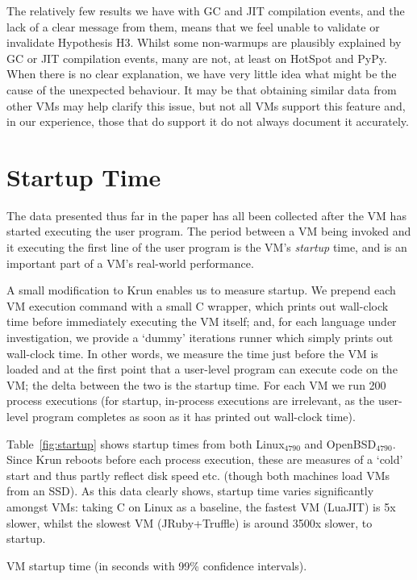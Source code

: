 \documentclass[acmlarge]{acmart}\settopmatter{printfolios=true}
\newcommand{\krun}{Krun\xspace}
\newcommand{\bencherfive}{Linux$_\mathrm{4790}$\xspace}
\newcommand{\benchersix}{OpenBSD$_\mathrm{4790}$\xspace}
\begin{document}
The relatively few results we have with GC and JIT compilation events, and the lack of a clear
message from them, means that we feel unable to validate or invalidate
Hypothesis H3. Whilst some non-warmups are plausibly explained by GC or JIT compilation events, many are not, at
least on HotSpot and PyPy. When there is no clear explanation, we have very little idea what might be
the cause of the unexpected behaviour. It may be that obtaining similar data
from other VMs may help clarify this issue, but not all VMs support this
feature and, in our experience, those that do support it do not always
document it accurately.

\section{Startup Time}
\label{sec:startup}
The data presented thus far in the paper has all been collected after the VM has
started executing the user program. The period between a VM being
invoked and it executing the first line of the user program is the VM's \emph{startup} time,
and is an important part of a VM's real-world performance.

A small modification to \krun enables us to measure startup. We prepend each VM
execution command with a small C wrapper, which prints out wall-clock time
before immediately executing the VM itself; and, for each language under
investigation, we provide a `dummy' iterations runner which simply prints out
wall-clock time. In other words, we measure the time just before the VM is loaded
and at the first point that a user-level program can execute code on the VM; the
delta between the two is the startup time. For each VM we run 200 process
executions (for startup, in-process executions are irrelevant,
as the user-level program completes as soon as it has printed out wall-clock
time).

Table~\ref{fig:startup} shows startup times from both \bencherfive and \benchersix. Since
\krun reboots before each process execution, these are measures of a `cold'
start and thus partly reflect disk speed etc. (though both machines load VMs
from an SSD). As this data clearly shows, startup time varies significantly amongst VMs:
taking C on Linux as a baseline, the fastest VM (LuaJIT) is 5x slower, whilst the
slowest VM (JRuby+Truffle) is around 3500x slower, to startup.

\begin{table}[t]
\centering

\caption{VM startup time (in seconds with 99\% confidence intervals).}
\label{fig:startup}
\end{table}
\end{document}
